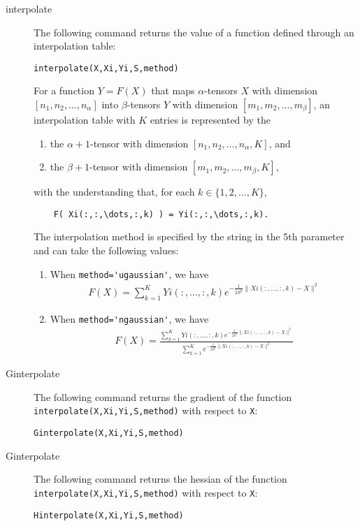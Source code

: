 \documentclass[11pt]{article}
\theoremstyle{remark}
\begin{document}
\begin{description}
\item[interpolate] The following command returns the value of a
  function defined through an interpolation table:
\begin{lstlisting}
interpolate(X,Xi,Yi,S,method)
\end{lstlisting}
  For a function $Y=F(X)$ that maps $\alpha$-tensors $X$ with dimension
  $[n_1,n_2,\dots,n_\alpha]$ into $\beta$-tensors $Y$ with dimension
  $[m_1,m_2,\dots,m_\beta]$, an interpolation table with $K$ entries is
  represented by the
  \begin{enumerate}
  \item the $\alpha+1$-tensor with dimension $[n_1,n_2,\dots,n_\alpha,K]$, and 
  \item the $\beta+1$-tensor with dimension $[m_1,m_2,\dots,m_\beta,K]$, 
  \end{enumerate}
  with the understanding that, for each $k\in\{1,2,\dots,K\}$,
  \begin{lstlisting}
    F( Xi(:,:,\dots,:,k) ) = Yi(:,:,\dots,:,k).
  \end{lstlisting}
  The interpolation method is specified by the string in the 5th
  parameter and can take the following values:
  \begin{enumerate}
  \item When \lstinline{method='ugaussian'}, we have
    \begin{align*}
      F(X)=\sum_{k=1}^K Yi(:,\dots,:,k) e^{-\frac{1}{2S^2}\|Xi(:,\dots,:,k)-X\|^2}
    \end{align*}
  \item When \lstinline{method='ngaussian'}, we have
    \begin{align*}
      F(X)=\frac{\sum_{k=1}^K Yi(:,\dots,:,k) e^{-\frac{1}{2S^2}\|Xi(:,\dots,:,k)-X\|^2}}
      {\sum_{k=1}^K e^{-\frac{1}{2S^2}\|Xi(:,\dots,:,k)-X\|^2}}
    \end{align*}
  \end{enumerate}

\item[Ginterpolate] The following command returns the gradient of the
  function \lstinline{interpolate(X,Xi,Yi,S,method)} with respect to \lstinline{X}:
\begin{lstlisting}
Ginterpolate(X,Xi,Yi,S,method)
\end{lstlisting}

\item[Ginterpolate] The following command returns the hessian of the
  function \lstinline{interpolate(X,Xi,Yi,S,method)} with respect to
  \lstinline{X}:
\begin{lstlisting}
Hinterpolate(X,Xi,Yi,S,method)
\end{lstlisting}


\end{description}
\end{document}
